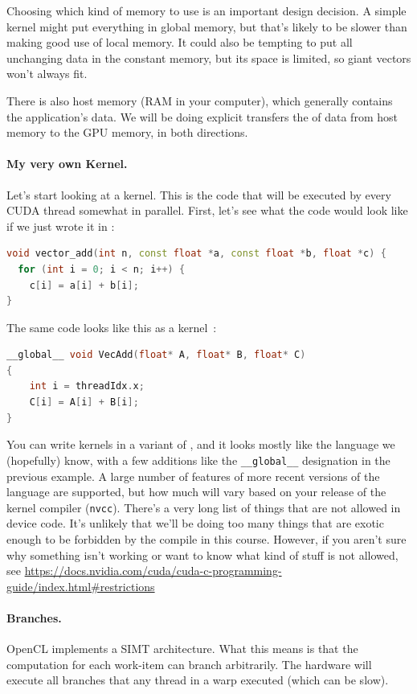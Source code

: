 Choosing which kind of memory to use is an important design decision. A simple kernel might put everything in global memory, but that's likely to be slower than making good use of local memory. It could also be tempting to put all unchanging data in the constant memory, but its space is limited, so giant vectors won't always fit.

There is also host memory (RAM in your computer), which generally contains the application's data. We will be doing explicit transfers the  of data from host memory to the GPU memory, in both directions.

\paragraph{My very own Kernel.} Let's start looking at a kernel. This is the code that will be executed by every CUDA thread somewhat in parallel. First, let's see what the code would look like if we just wrote it in \CPP:

\begin{lstlisting}[language=C++]
void vector_add(int n, const float *a, const float *b, float *c) {
  for (int i = 0; i < n; i++) {
    c[i] = a[i] + b[i];
}
\end{lstlisting}


The same code looks like this as a kernel~\cite{cuda}:
\begin{lstlisting}[language=C++]
__global__ void VecAdd(float* A, float* B, float* C)
{
    int i = threadIdx.x;
    C[i] = A[i] + B[i];
}
\end{lstlisting}

You can write kernels in a variant of \CPP, and it looks mostly like the language we (hopefully) know, with a few additions like the \texttt{\_\_global\_\_} designation in the previous example. A large number of features of more recent versions of the language are supported, but how much will vary based on your release of the kernel compiler (\texttt{nvcc}). There's a very long list of things that are not allowed in device code. It's unlikely that we'll be doing too many things that are exotic enough to be forbidden by the compile in this course. However, if you aren't sure why something isn't working or want to know what kind of stuff is not allowed, see \url{https://docs.nvidia.com/cuda/cuda-c-programming-guide/index.html#restrictions}

\paragraph{Branches.} OpenCL implements a SIMT architecture.
What this means is that the computation for each work-item can branch
arbitrarily. The hardware will execute all branches that any thread in
a warp executed (which can be slow). 

